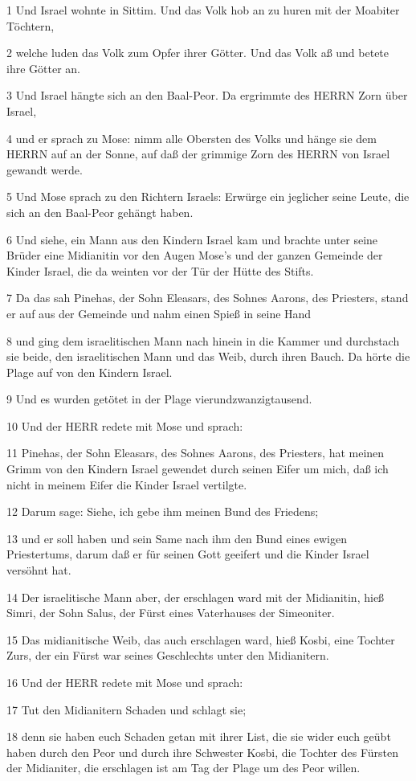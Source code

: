 \par 1 Und Israel wohnte in Sittim. Und das Volk hob an zu huren mit der Moabiter Töchtern,
\par 2 welche luden das Volk zum Opfer ihrer Götter. Und das Volk aß und betete ihre Götter an.
\par 3 Und Israel hängte sich an den Baal-Peor. Da ergrimmte des HERRN Zorn über Israel,
\par 4 und er sprach zu Mose: nimm alle Obersten des Volks und hänge sie dem HERRN auf an der Sonne, auf daß der grimmige Zorn des HERRN von Israel gewandt werde.
\par 5 Und Mose sprach zu den Richtern Israels: Erwürge ein jeglicher seine Leute, die sich an den Baal-Peor gehängt haben.
\par 6 Und siehe, ein Mann aus den Kindern Israel kam und brachte unter seine Brüder eine Midianitin vor den Augen Mose's und der ganzen Gemeinde der Kinder Israel, die da weinten vor der Tür der Hütte des Stifts.
\par 7 Da das sah Pinehas, der Sohn Eleasars, des Sohnes Aarons, des Priesters, stand er auf aus der Gemeinde und nahm einen Spieß in seine Hand
\par 8 und ging dem israelitischen Mann nach hinein in die Kammer und durchstach sie beide, den israelitischen Mann und das Weib, durch ihren Bauch. Da hörte die Plage auf von den Kindern Israel.
\par 9 Und es wurden getötet in der Plage vierundzwanzigtausend.
\par 10 Und der HERR redete mit Mose und sprach:
\par 11 Pinehas, der Sohn Eleasars, des Sohnes Aarons, des Priesters, hat meinen Grimm von den Kindern Israel gewendet durch seinen Eifer um mich, daß ich nicht in meinem Eifer die Kinder Israel vertilgte.
\par 12 Darum sage: Siehe, ich gebe ihm meinen Bund des Friedens;
\par 13 und er soll haben und sein Same nach ihm den Bund eines ewigen Priestertums, darum daß er für seinen Gott geeifert und die Kinder Israel versöhnt hat.
\par 14 Der israelitische Mann aber, der erschlagen ward mit der Midianitin, hieß Simri, der Sohn Salus, der Fürst eines Vaterhauses der Simeoniter.
\par 15 Das midianitische Weib, das auch erschlagen ward, hieß Kosbi, eine Tochter Zurs, der ein Fürst war seines Geschlechts unter den Midianitern.
\par 16 Und der HERR redete mit Mose und sprach:
\par 17 Tut den Midianitern Schaden und schlagt sie;
\par 18 denn sie haben euch Schaden getan mit ihrer List, die sie wider euch geübt haben durch den Peor und durch ihre Schwester Kosbi, die Tochter des Fürsten der Midianiter, die erschlagen ist am Tag der Plage um des Peor willen.

